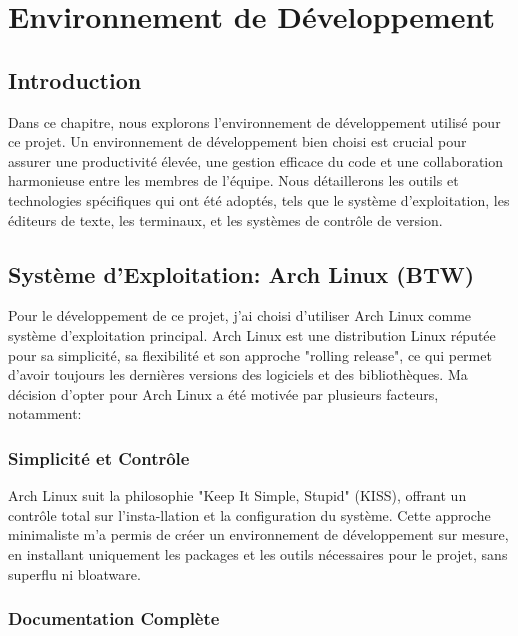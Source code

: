 \chapter{Environnement de Développement}
\label{chap:Chapter 2 title}
\section*{Introduction}


\hspace{16pt}Dans ce chapitre, nous explorons l'environnement de développement utilisé pour ce projet. Un environnement de développement bien choisi est crucial pour assurer une productivité élevée, une gestion efficace du code et une collaboration harmonieuse entre les membres de l'équipe. Nous détaillerons les outils et technologies spécifiques qui ont été adoptés, tels que le système d'exploitation, les éditeurs de texte, les terminaux, et les systèmes de contrôle de version.


\pagebreak


\section{Système d'Exploitation: Arch Linux (BTW)}

\hspace{16pt}Pour le développement de ce projet, j'ai choisi d'utiliser Arch Linux comme système d'exploitation principal. Arch Linux est une distribution Linux réputée pour sa simplicité, sa flexibilité et son approche "rolling release", ce qui permet d'avoir toujours les dernières versions des logiciels et des bibliothèques. Ma décision d'opter pour Arch Linux a été motivée par plusieurs facteurs, notamment:

\subsection{Simplicité et Contrôle}

\hspace{16pt}Arch Linux suit la philosophie "Keep It Simple, Stupid" (KISS), offrant un contrôle total sur l'insta-llation et la configuration du système. Cette approche minimaliste m'a permis de créer un environnement de développement sur mesure, en installant uniquement les packages et les outils nécessaires pour le projet, sans superflu ni bloatware.

\subsection{Documentation Complète}

